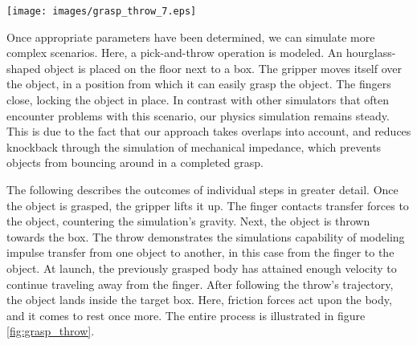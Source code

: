 %
\begin{figure*}
	\centering
	\texttt{[image: images/grasp\_throw\_7.eps]}
	\caption{Grasping an object and throwing it into box}
	\label{fig:grasp_throw}
\end{figure*}

Once appropriate parameters have been determined, we can simulate more complex scenarios. Here, a pick-and-throw operation is modeled. An hourglass-shaped object is placed on the floor next to a box. The gripper moves itself over the object, in a position from which it can easily grasp the object. The fingers close, locking the object in place. In contrast with other simulators that often encounter problems with this scenario, our physics simulation remains steady. This is due to the fact that our approach takes overlaps into account, and reduces knockback through the simulation of mechanical impedance, which prevents objects from bouncing around in a completed grasp.

The following describes the outcomes of individual steps in greater detail.
Once the object is grasped, the gripper lifts it up. The finger contacts transfer forces to the object, countering the simulation's gravity. Next, the object is thrown towards the box. The throw demonstrates the simulations capability of modeling impulse transfer from one object to another, in this case from the finger to the object. At launch, the previously grasped body has attained enough velocity to continue traveling away from the finger.
After following the throw's trajectory, the object lands inside the target box. Here, friction forces act upon the body, and it comes to rest once more.
The entire process is illustrated in figure \ref{fig:grasp_throw}. 